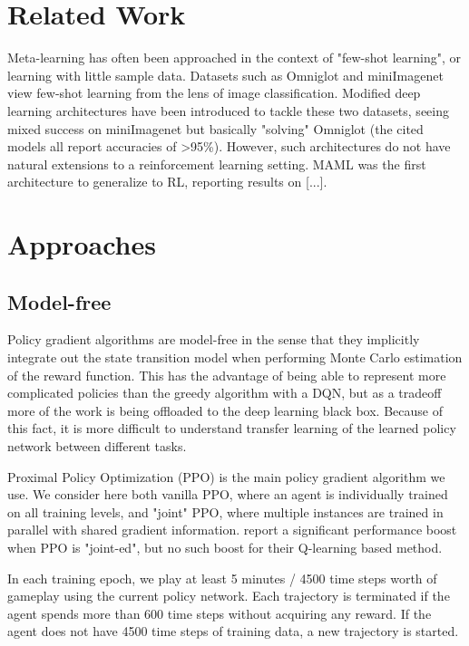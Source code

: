 \documentclass{article}
\begin{document}
\section{Related Work}

Meta-learning has often been approached in the context of "few-shot learning", or learning with little sample data. Datasets such as Omniglot \citep{lake} and miniImagenet \citep{} \citep{} view few-shot learning from the lens of image classification. Modified deep learning architectures \citep{} \citep{} \citep{} have been introduced to tackle these two datasets, seeing mixed success on miniImagenet but basically "solving" Omniglot (the cited models all report accuracies of >95\%). However, such architectures do not have natural extensions to a reinforcement learning setting. MAML \citep{maml} was the first architecture to generalize to RL, reporting results on [...]. 

\section{Approaches}
\subsection{Model-free}
Policy gradient algorithms are model-free in the sense that they implicitly integrate out the state transition model when performing Monte Carlo estimation of the reward function. This has the advantage of being able to represent more complicated policies than the greedy algorithm with a DQN, but as a tradeoff more of the work is being offloaded to the deep learning black box. Because of this fact, it is more difficult to understand transfer learning of the learned policy network between different tasks. 

Proximal Policy Optimization (PPO) is the main policy gradient algorithm we use. We consider here both vanilla PPO, where an agent is individually trained on all training levels, and "joint" PPO, where multiple instances are trained in parallel with shared gradient information. \citep{retro} report a significant performance boost when PPO is "joint-ed", but no such boost for their Q-learning based method.

In each training epoch, we play at least 5 minutes / 4500 time steps worth of gameplay using the current policy network. Each trajectory is terminated if the agent spends more than 600 time steps without acquiring any reward. If the agent does not have 4500 time steps of training data, a new trajectory is started. 
\end{document}
